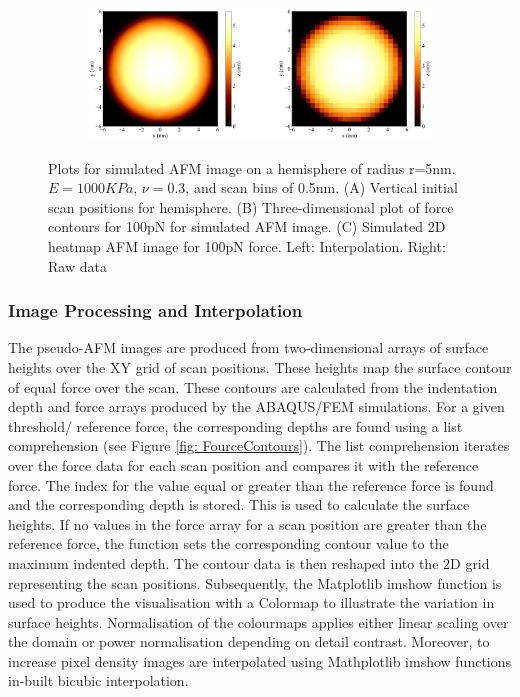 \begin{figure}[H]
\begin{subfigure}{0.49\textwidth}
    \end{subfigure}
    \hfill
    \begin{subfigure}{0.89\textwidth}
        \centering
        \caption{\label{fig: TestRasterScan-AFM}  }
        \includegraphics[width=1\linewidth]{Figures/TestRasterScan-AFM.png}
    \end{subfigure}

    
    \caption{\label{fig: TestRasterScan}Plots for simulated AFM image on a hemisphere of radius r=5nm. $E=1000KPa$, $\nu =0.3$, and scan bins of 0.5nm. (A) Vertical initial scan positions for hemisphere. (B) Three-dimensional plot of force contours for 100pN for simulated AFM image. (C) Simulated 2D heatmap AFM image for 100pN force. Left: Interpolation. Right: Raw data }
\end{figure}

\subsubsection{Image Processing and Interpolation}

The pseudo-AFM images are produced from two-dimensional arrays of surface heights over the XY grid of scan positions. These heights map the surface contour of equal force over the scan. These contours are calculated from the indentation depth and force arrays produced by the ABAQUS/FEM simulations. For a given threshold/ reference force, the corresponding depths are found using a list comprehension (see Figure \ref{fig: FourceContours}). The list comprehension iterates over the force data for each scan position and compares it with the reference force. The index for the value equal or greater than the reference force is found and the corresponding depth is stored. This is used to calculate the surface heights. If no values in the force array for a scan position are greater than the reference force, the function sets the corresponding contour value to the maximum indented depth. The contour data is then reshaped into the 2D grid representing the scan positions. Subsequently, the Matplotlib imshow function is used to produce the visualisation with a Colormap to illustrate the variation in surface heights. Normalisation of the colourmaps applies either linear scaling over the domain or power normalisation depending on detail contrast. Moreover, to increase pixel density images are interpolated using Mathplotlib imshow functions in-built bicubic interpolation.

